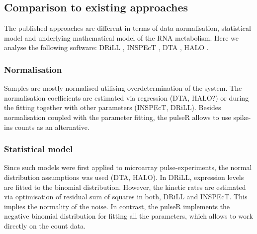 \subsection{Comparison to existing approaches}
The published approaches are different in terms of 
data normalisation, statistical model and underlying mathematical model of the 
RNA metabolism. Here we analyse the following software:
DRiLL \citep{rabani2014high},
INSPEcT \citep{de2015inspect},
DTA \citep{schwalb2012measurement},
HALO \citep{friedel2010halo}.
\subsubsection*{Normalisation}
Samples are mostly normalised utilising overdetermination of the system.
The normalisation coefficients are estimated via regression
(DTA, HALO?) or during the fitting together 
with other parameters (INSPEcT, DRiLL). 
Besides normalisation coupled with the parameter fitting, 
the pulseR allows to use spike-ins counts as an alternative.

\subsubsection*{Statistical model}

Since such models were first applied to microarray pulse-experiments,
the normal distribution assumptions was used (DTA, HALO).
In DRiLL, expression levels are fitted to the binomial distribution. 
However, the kinetic rates are estimated via
optimisation of residual sum of squares in both, DRiLL and 
INSPEcT.
This implies the normality of the noise.
In contrast, the pulseR implements the negative binomial distribution
for fitting all the parameters,
which allows to work directly on the count data.
